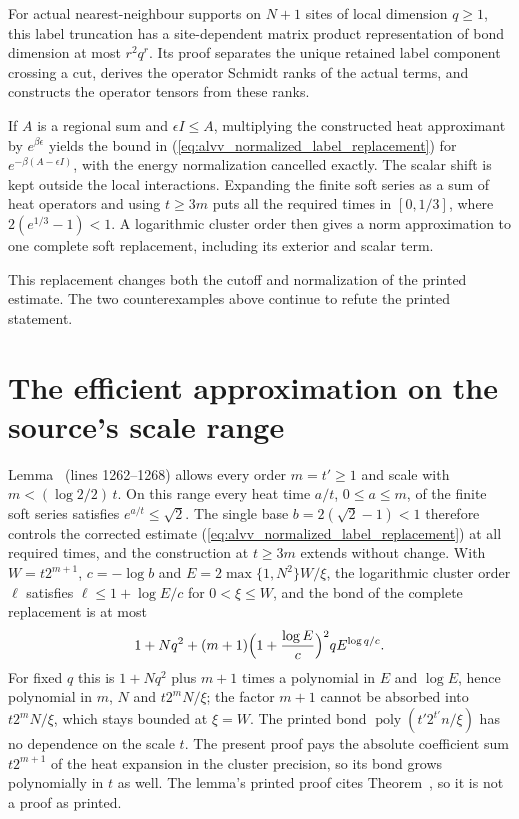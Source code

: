 \documentclass{article}
\begin{document}
For actual nearest-neighbour supports on $N+1$ sites of local dimension
$q\geq1$, this label truncation has a site-dependent matrix product
representation of bond dimension at most $r^2q^r$. Its proof separates the
unique retained label component crossing a cut, derives the operator Schmidt
ranks of the actual terms, and constructs the operator tensors from these
ranks.

If $A$ is a regional sum and $\epsilon I\leq A$, multiplying the constructed
heat approximant by $e^{\beta\epsilon}$ yields the bound in
(\ref{eq:alvv_normalized_label_replacement}) for
$e^{-\beta(A-\epsilon I)}$, with the energy normalization cancelled exactly.
The scalar shift is kept outside the local interactions.
Expanding the finite soft series as a sum of heat operators and using
$t\geq3m$ puts all the required times in $[0,1/3]$, where
$2(e^{1/3}-1)<1$. A logarithmic cluster order then gives a norm approximation
to one complete soft replacement, including its exterior and scalar term.

This replacement changes both the cutoff and normalization of the printed
estimate. The two counterexamples above continue to refute the printed
statement.

\section{The efficient approximation on the source's scale range}
\label{sec:alvv_source_range}

Lemma~ (lines 1262--1268) allows every order
$m=t'\geq1$ and scale with $m<(\log2/2)\,t$. On this range every heat
time $a/t$, $0\leq a\leq m$, of the finite soft series satisfies
$e^{a/t}\leq\sqrt2$. The single base $b=2(\sqrt2-1)<1$ therefore controls
the corrected estimate (\ref{eq:alvv_normalized_label_replacement}) at all
required times, and the construction at $t\geq3m$ extends without change.
With $W=t2^{m+1}$, $c=-\log b$ and $E=2\max\{1,N^2\}W/\xi$, the
logarithmic cluster order $\ell$ satisfies $\ell\leq1+\log E/c$ for
$0<\xi\leq W$, and the bond of the complete replacement is at most
\begin{align}
    1+Nq^2+(m+1)\Bigl(1+\frac{\log E}{c}\Bigr)^2qE^{\log q/c}.
    \label{eq:alvv_source_range_bond}
\end{align}
For fixed $q$ this is $1+Nq^2$ plus $m+1$ times a polynomial in $E$ and
$\log E$, hence polynomial in $m$, $N$ and $t2^mN/\xi$; the factor $m+1$
cannot be absorbed into $t2^mN/\xi$, which stays bounded at $\xi=W$. The printed bond
$\operatorname{poly}(t'2^{t'}n/\xi)$ has no dependence on the scale $t$.
The present proof pays the absolute coefficient sum $t2^{m+1}$ of the heat
expansion in the cluster precision, so its bond grows polynomially in $t$
as well. The lemma's printed proof cites
Theorem~, so it is not a proof as printed.
\end{document}
